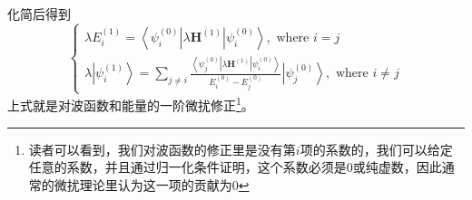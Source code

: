 \documentclass[12pt,a4paper,openany,twoside]{book}
\numberwithin{equation}{section}
\begin{document}
            化简后得到
            \begin{equation}
              \left\{\begin{array}{l}{\lambda E_{i}^{(1)}=\left\langle\psi_{i}^{(0)}\left|\lambda\mathbf{H}^{(1)}\right| \psi_{i}^{(0)}\right\rangle, \text { where } i=j} \\ {\lambda\left|\psi_{i}^{(1)}\right\rangle=\sum_{j \neq i} \frac{\left\langle\psi_{j}^{(0)}\left|\lambda\mathbf{H}^{(1)}\right| \psi_{i}^{(0)}\right\rangle}{E_{i}^{(0)}-E_{j}^{(0)}}\left|\psi_{j}^{(0)}\right\rangle, \text { where } i \neq j}\end{array}\right.
            \end{equation}
            上式就是对波函数和能量的一阶微扰修正\footnote{读者可以看到，我们对波函数的修正里是没有第$i$项的系数的，我们可以给定任意的系数，并且通过归一化条件证明，这个系数必须是$0$或纯虚数，因此通常的微扰理论里认为这一项的贡献为$0$}。
\end{document}
